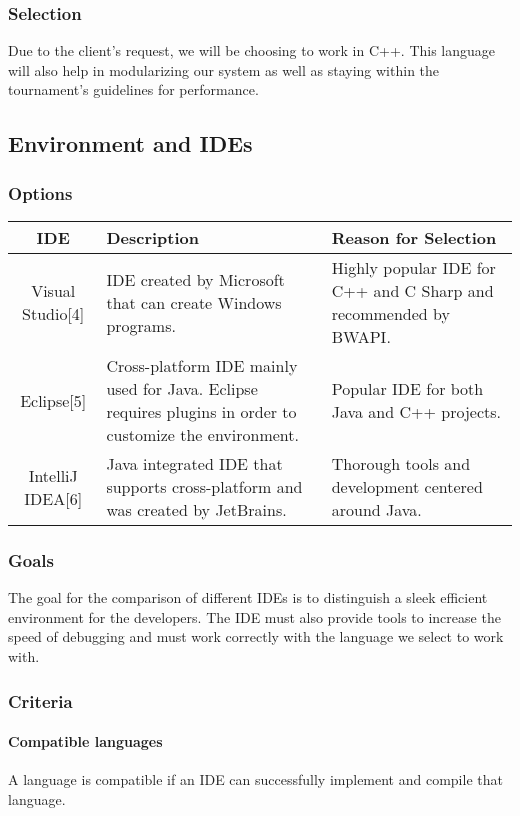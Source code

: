 \documentclass[10pt,letterpaper,onecolumn,draftclsnofoot]{IEEEtran}
\begin{document}
\subsubsection{Selection}
Due to the client's request, we will be choosing to work in C++. This language will also help in modularizing our system as well as staying within the tournament's guidelines for performance.

\subsection{Environment and IDEs}
\subsubsection{Options}
\begin{center}
\begin{tabular}{ ||C|L|L|| } 
\hline
IDE & Description & Reason for Selection \\
 \hline
 Visual Studio[4] & IDE created by Microsoft that can create Windows programs.  & Highly popular IDE for C++ and C Sharp and recommended by BWAPI. \\ 
 \hline
 Eclipse[5] & Cross-platform IDE mainly used for Java. Eclipse requires plugins in order to customize the environment. & Popular IDE for both Java and C++ projects. \\ 
 \hline
 IntelliJ IDEA[6] & Java integrated IDE that supports cross-platform and was created by JetBrains.
 & Thorough tools and development centered around Java. \\ 
 \hline
\end{tabular}
\end{center}

\subsubsection{Goals}
The goal for the comparison of different IDEs is to distinguish a sleek efficient environment for the developers. The IDE must also provide tools to increase the speed of debugging and must work correctly with the language we select to work with.

\subsubsection{Criteria}
\paragraph{Compatible languages}
A language is compatible if an IDE can successfully implement and compile that language.
\end{document}
